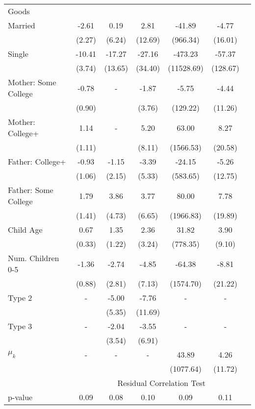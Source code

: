 \begin{tabular}{lcccccc}
Goods}\\\cmidrule(r){2-7}Married&-2.61&0.19&2.81&-41.89&-4.77&\\&(2.27)&(6.24)&(12.69)&(966.34)&(16.01)&\\Single&-10.41&-17.27&-27.16&-473.23&-57.37&\\&(3.74)&(13.65)&(34.40)&(11528.69)&(128.67)&\\Mother: Some College&-0.78&-&-1.87&-5.75&-4.44&\\&(0.90)&&(3.76)&(129.22)&(11.26)&\\Mother: College+&1.14&-&5.20&63.00&8.27&\\&(1.11)&&(8.11)&(1566.53)&(20.58)&\\Father: College+&-0.93&-1.15&-3.39&-24.15&-5.26&\\&(1.06)&(2.15)&(5.33)&(583.65)&(12.75)&\\Father: Some College&1.79&3.86&3.77&80.00&7.78&\\&(1.41)&(4.73)&(6.65)&(1966.83)&(19.89)&\\Child Age&0.67&1.35&2.36&31.82&3.90&\\&(0.33)&(1.22)&(3.24)&(778.35)&(9.10)&\\Num. Children 0-5&-1.36&-2.74&-4.85&-64.38&-8.81&\\&(0.88)&(2.81)&(7.13)&(1574.70)&(21.22)&\\Type 2&-&-5.00&-7.76&-&-&\\&&(5.35)&(11.69)&&&\\Type 3&-&-2.04&-3.55&-&-&\\&&(3.54)&(6.91)&&&\\$\mu_{k}$&-&-&-&43.89&4.26&\\&&&&(1077.64)&(11.72)&\\& \multicolumn{6}{c}{Residual Correlation Test}\\\cmidrule(r){2-7}p-value&0.09&0.08&0.10&0.09&0.11&\\
\bottomrule\end{tabular}